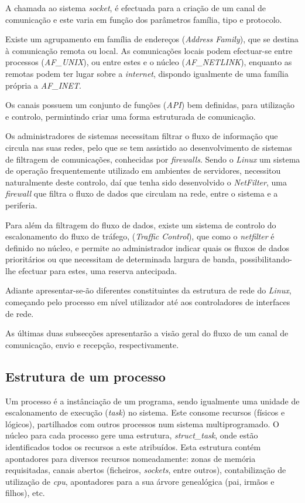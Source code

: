 A chamada ao sistema \textit{socket}, é efectuada para a criação de um canal de comunicação e este varia em função dos parâmetros família, tipo e protocolo.

Existe um agrupamento em família de endereços (\textit{Address Family}), que se destina à comunicação remota ou local.
As comunicações locais podem efectuar-se entre processos (\textit{AF\_UNIX}), ou entre estes e o núcleo (\textit{AF\_NETLINK}), enquanto as remotas podem ter lugar sobre a \textit{internet}, dispondo igualmente de uma família própria a \textit{AF\_INET}.

Os canais possuem um conjunto de funções (\textit{API}) bem definidas, para utilização e controlo, permintindo criar uma forma estruturada de comunicação.

Os administradores de sistemas necessitam filtrar o fluxo de informação que circula nas suas redes, pelo que se tem assistido ao desenvolvimento de sistemas de filtragem de comunicações, conhecidas por \textit{firewalls}.
Sendo o \textit{Linux} um sistema de operação frequentemente utilizado em ambientes de servidores, necessitou naturalmente deste controlo, daí que tenha sido desenvolvido o \textit{NetFilter}, uma \textit{firewall} que \color{red}filtra \color{black}o fluxo de dados que circulam na rede, entre o sistema e a periferia.

Para além da filtragem do fluxo de dados, existe um sistema de controlo do escalonamento do fluxo de tráfego, (\textit{Traffic Control}), que como o \textit{netfilter} é definido no núcleo, e permite ao administrador indicar quais os fluxos de dados prioritários ou que necessitam de determinada largura de banda, possibilitando-lhe efectuar para estes, uma reserva antecipada.
 
Adiante apresentar-se-ão diferentes constituintes da estrutura de rede do \textit{Linux}, começando pelo processo em nível utilizador até aos controladores de interfaces de rede.

\color{red}As últimas duas subsecções apresentarão a visão geral do fluxo de um canal de comunicação, envio e recepção, respectivamente.\color{black}

\subsection{Estrutura de um processo}

Um processo é a instânciação de um programa, sendo igualmente uma unidade de escalonamento de execução (\textit{task}) no sistema.
Este consome recursos (físicos e lógicos), partilhados com outros processos num sistema multiprogramado.
O núcleo para cada processo gere uma estrutura, \textit{struct\_task}, onde estão identificados todos os recursos a este atribuídos.
Esta estrutura contém apontadores para diversos recursos nomeadamente: zonas de memória requisitadas, canais abertos (ficheiros, \textit{sockets}, entre outros), contabilização de utilização de \textit{cpu}, apontadores para a sua árvore genealógica (pai, irmãos e filhos), etc.

